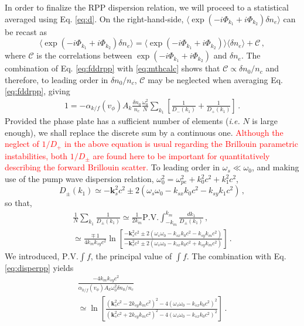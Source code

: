 \documentclass[
 reprint,
 superscriptaddress,
 amsmath,amssymb,
 aps,
]{revtex4-1}
\def\tc{\textcolor{red}}
\begin{document}
In order to finalize the RPP dispersion relation, we will proceed to a statistical averaged using Eq. \eqref{eq:d}. On the right-hand-side,  $\langle\exp(-i\Phi_{k_1}+i\Phi_{k_2})\delta n_e \rangle$ can be recast as
\begin{equation}
\langle\exp(-i\Phi_{k_1}+i\Phi_{k_2})\delta n_e \rangle= \langle\exp(-i\Phi_{k_1}+i\Phi_{k_2}) \rangle\langle\delta n_e \rangle + \mathcal{C}\, , \label{eq:mthcalc}
\end{equation}
where $\mathcal{C}$ is the correlations   between  \mbox{$\exp(-i\Phi_{k_1}+i\Phi_{k_2})$} and $\delta n_e$. The combination of Eq. \eqref{eq:fddrpp} with \eqref{eq:mthcalc} shows that $\mathcal{C}\propto \delta n_0/n_c$ and therefore, to leading order in $\delta n_0/n_c$, $\mathcal{C}$ may  be neglected when  averaging   Eq. \eqref{eq:fddrpp}, giving
\begin{align}
  1= -\alpha_{k/f}(v_\phi)A_k \frac{\delta n_0}{n_c} \frac{\omega_0^2}{N}\sum_{ k_{1} }        \left[ \frac{1 }{D_-(k_{1})} +\frac{1}{D_+(k_{1})} \right] \, .\label{eq:disperpp} 
\end{align}
Provided the phase plate has a sufficient number of elements (\emph{i.e.} $N$ is large enough), we shall replace the discrete sum by a continuous one. 
\tc{Although the neglect of  $1/D_+$ in the above equation is usual regarding the Brillouin parametric instabilities, both  $1/D_\pm$ are found here to be important for  quantitatively describing the forward Brillouin scatter. }
To leading order 
in  $\omega_s\ll\omega_0$, and making use of the pump wave dispersion relation, $\omega_0^2=\omega_{pe}^2+k_0^2c^2+k_1^2c^2$,
\begin{equation}\label{eq:dpmk1}
D_\pm(k_1) \simeq -\mathbf{k}_s^2c^2\pm 2(\omega_s\omega_0 - k_{sx}k_0 c^2-k_{sy} k_1 c^2) \, , 
\end{equation} 
so that,
\begin{align}
 \frac{1}{N} \sum_{ k_{1} }  \frac{1 }{D_\pm(k_{1})}  \simeq \frac{1}{2k_m} \mathrm{P.V.} \int_{ -k_m }^{ k_m }       \frac{dk_1 }{D_\pm(k_{1})}  \, , \nonumber\\
 \simeq \frac{\mp\,1}{4k_mk_{sy}c^2} \ln\left[
 \frac{ -\mathbf{k}_s^2c^2\pm 2(\omega_s\omega_0 - k_{sx}k_0 c^2-k_{sy} k_m c^2)}{ -\mathbf{k}_s^2c^2\pm 2(\omega_s\omega_0 - k_{sx}k_0 c^2+k_{sy} k_m c^2)} \right] \, .\label{eq:sumint} 
\end{align}
We introduced, $\mathrm{P.V.}\int f$, the principal value of $\int f$.
The combination with Eq. \eqref{eq:disperpp} yields
\begin{align}
 \frac{-4k_mk_{sy}c^2}{\alpha_{k/f}(v_\phi)A_k \omega_0^2\delta n_0/n_c  } \nonumber\\
 \simeq  \ln\left[
 \frac{ (\mathbf{k}_s^2c^2-2k_{sy} k_m c^2)^2 -4(\omega_s\omega_0 - k_{sx}k_0 c^2)^2}{ (\mathbf{k}_s^2c^2+2k_{sy} k_m c^2)^2 -4(\omega_s\omega_0 - k_{sx}k_0 c^2)^2} \right] \, .\label{eq:disperpp2} 
\end{align}
\end{document}
